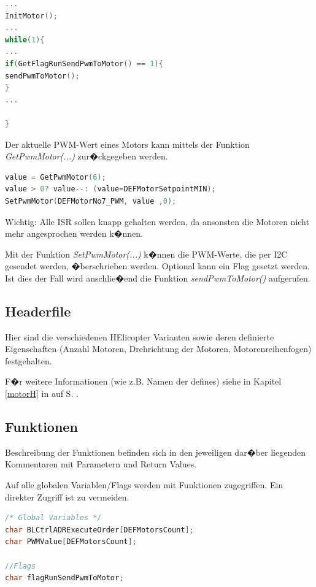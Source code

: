 \begin{lstlisting}[language=C++]
...
InitMotor();
...
while(1){
...
if(GetFlagRunSendPwmToMotor() == 1){
sendPwmToMotor();
}
...

}
\end{lstlisting}
Der aktuelle PWM-Wert eines Motors kann mittels der Funktion \emph{GetPwmMotor(...)} zur�ckgegeben werden.

\begin{lstlisting}[language=C++]
value = GetPwmMotor(6);
value > 0? value--: (value=DEFMotorSetpointMIN);
SetPwmMotor(DEFMotorNo7_PWM, value ,0);
\end{lstlisting}

Wichtig: Alle ISR sollen knapp gehalten werden, da ansonsten die Motoren nicht mehr angesprochen werden k�nnen.

Mit der Funktion \emph{SetPwmMotor(...)} k�nnen die PWM-Werte, die  per I2C gesendet werden, �berschrieben werden. Optional kann ein Flag gesetzt werden. Ist dies der Fall wird anschlie�end die Funktion \emph{sendPwmToMotor()} aufgerufen.

\subsection{Headerfile}

Hier sind die verschiedenen HElicopter Varianten sowie deren definierte Eigenschaften (Anzahl Motoren, Drehrichtung der Motoren, Motorenreihenfogen) festgehalten.

F�r weitere Informationen (wie z.B. Namen der defines) siehe in Kapitel \ref{motorH} in   auf S.\pageref{motorH} .

\subsection{Funktionen}

Beschreibung der Funktionen befinden sich in den jeweiligen dar�ber liegenden Kommentaren mit Parametern und Return Values.

Auf alle globalen Variablen/Flags werden mit Funktionen zugegriffen. Ein direkter Zugriff ist zu vermeiden.

\begin{lstlisting}[language=C++,firstnumber=14]
/* Global Variables */
char BLCtrlADRExecuteOrder[DEFMotorsCount];
char PWMValue[DEFMotorsCount];

//Flags
char flagRunSendPwmToMotor;
\end{lstlisting}

